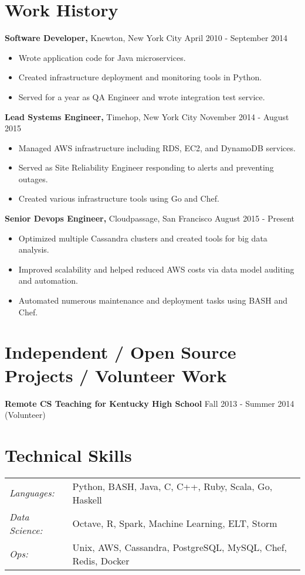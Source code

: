 \documentclass[line,overlapped]{res}
\begin{document}
\begin{resume}
\section{Work History}
    {\bf Software Developer,} Knewton, New York City \hfill April 2010 - September 2014
\begin{itemize} \itemsep -2pt
        \item Wrote application code for Java microservices.
        \item Created infrastructure deployment and monitoring tools in Python.
        \item Served for a year as QA Engineer and wrote integration test service.
\end{itemize}
    \vspace{-10pt}
    {\bf Lead Systems Engineer,} Timehop, New York City \hfill November 2014 - August 2015
\begin{itemize} \itemsep -2pt
        \item Managed AWS infrastructure including RDS, EC2, and DynamoDB services.
        \item Served as Site Reliability Engineer responding to alerts and preventing outages.
        \item Created various infrastructure tools using Go and Chef.
\end{itemize} \itemsep -2pt
    \vspace{-10pt}
    {\bf Senior Devops Engineer,} Cloudpassage, San Francisco \hfill August 2015 - Present
\begin{itemize} \itemsep -2pt
        \item Optimized multiple Cassandra clusters and created tools for big data analysis.
        \item Improved scalability and helped reduced AWS costs via data model auditing and automation.
        \item Automated numerous maintenance and deployment tasks using BASH and Chef.
\end{itemize}

\section{Independent / Open Source Projects / Volunteer Work}
{\bf Remote CS Teaching for Kentucky High School} \hfill Fall 2013 - Summer 2014 (Volunteer)

\section{Technical Skills}
   \begin{tabular}{l p{4in}}
       {\sl Languages:}& Python, BASH, Java, C, C++, Ruby, Scala, Go, Haskell\\
       {\sl Data Science:}& Octave, R, Spark, Machine Learning, ELT, Storm\\
       {\sl Ops:}& Unix, AWS, Cassandra, PostgreSQL, MySQL, Chef, Redis, Docker\\
 \end{tabular}


\end{resume}
\end{document}
